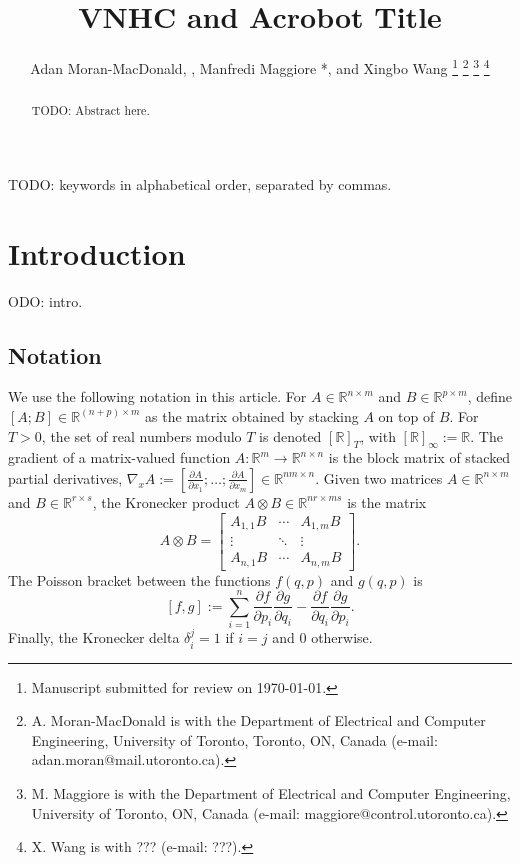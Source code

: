 \documentclass[journal,twoside,web]{ieeecolor}
\newcommand*{\Title}{VNHC and Acrobot Title}
\newcommand*{\Rt}[1]{[\R]_{#1}}
\newcommand*{\R}{\mathbb{R}}
\newcommand*{\pdiff}[2]{\frac{\partial #1}{\partial #2}}
\begin{document}
\title{\Title}
\author{Adan Moran-MacDonald, , Manfredi Maggiore
*, and Xingbo Wang
\thanks{Manuscript submitted for review on \today.}
\thanks{A. Moran-MacDonald is with the Department of Electrical and Computer
    Engineering, University of Toronto, Toronto, ON, Canada (e-mail:
adan.moran@mail.utoronto.ca).}
\thanks{M. Maggiore is with the Department of Electrical and Computer
Engineering, University of Toronto, ON, Canada (e-mail:
maggiore@control.utoronto.ca).}
\thanks{X. Wang is with ??? (e-mail: ???).}
} %

\maketitle

\begin{abstract}
TODO: Abstract here.
\end{abstract}

\begin{IEEEkeywords}
TODO: keywords in alphabetical order, separated by commas.
\end{IEEEkeywords}

\section{Introduction}\label{sec:introduction}
ODO: intro.

\subsection{Notation}
We use the following notation in this article.
For \(A \in \R^{n\times m}\) and \(B \in \R^{p \times m}\),
define \([A;B] \in \R^{(n+p)\times m}\) as the matrix obtained by stacking \(A\)
on top of \(B\). 
For \(T > 0\), the set of real numbers modulo \(T\) is denoted \(\Rt{T}\), with
\(\Rt{\infty} := \R\).
The gradient of a matrix-valued function 
\(A : \R^m \rightarrow \R^{n\times n}\) is the block matrix of stacked partial
derivatives, 
\(\nabla_xA := [\pdiff{A}{x_1};\ldots;\pdiff{A}{x_m}] \in \R^{nm \times n}\).
Given two matrices \(A \in \R^{n \times m}\) and \(B \in \R^{r \times s}\), the
Kronecker product \cite{kronprod} \(A \otimes B \in \R^{nr \times ms}\) is the
matrix
\begin{equation}\label{eqn:kronprod}
    A \otimes B = \begin{bmatrix}
        A_{1,1}B & \cdots & A_{1,m} B \\
        \vdots & \ddots & \vdots \\
        A_{n,1} B & \cdots & A_{n,m} B
    \end{bmatrix} 
    .
\end{equation}
The Poisson bracket \cite{landau_mechanics} between the functions
\(f(q,p)\) and \(g(q,p)\) is
\begin{equation}\label{eqn:poisson-bracket}
    [f,g] := \sum \limits_{i=1}^n \pdiff{f}{p_i}\pdiff{g}{q_i} - 
        \pdiff{f}{q_i}\pdiff{g}{p_i}
    .
\end{equation}
Finally, the Kronecker delta \(\delta_i^j = 1\) if \(i = j\) and \(0\)
otherwise.
\end{document}
